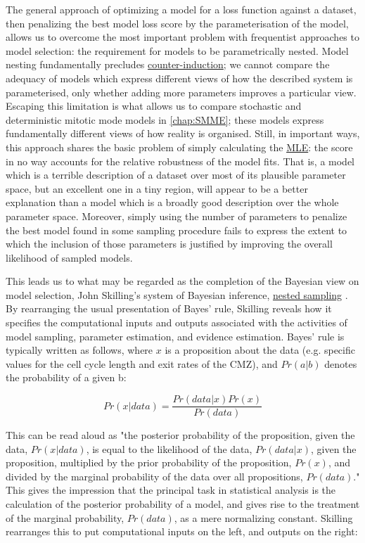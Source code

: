 The general approach of optimizing a model for a loss function against a dataset, then penalizing the best model loss score by the parameterisation of the model, allows us to overcome the most important problem with frequentist approaches to model selection: the requirement for models to be parametrically nested. Model nesting fundamentally precludes \hyperref[sec:Feyerabend]{counter-induction}; we cannot compare the adequacy of models which express different views of how the described system is parameterised, only whether adding more parameters improves a particular view. Escaping this limitation is what allows us to compare stochastic and deterministic mitotic mode models in \autoref{chap:SMME}; these models express fundamentally different views of how reality is organised. Still, in important ways, this approach shares the basic problem of simply calculating the \hyperref[MLE]{MLE}: the score in no way accounts for the relative robustness of the model fits. That is, a model which is a terrible description of a dataset over most of its plausible parameter space, but an excellent one in a tiny region, will appear to be a better explanation than a model which is a broadly good description over the whole parameter space. Moreover, simply using the number of parameters to penalize the best model found in some sampling procedure fails to express the extent to which the inclusion of those parameters is justified by improving the overall likelihood of sampled models.

This leads us to what may be regarded as the completion of the Bayesian view on model selection, John Skilling's system of Bayesian inference, \hyperref[sec:nested]{nested sampling} \cite{Skilling2006,Skilling2012,Skilling2019}. By rearranging the usual presentation of Bayes' rule, Skilling reveals how it specifies the computational inputs and outputs associated with the activities of model sampling, parameter estimation, and evidence estimation. Bayes' rule is typically written as follows, where $x$ is a proposition about the data (e.g. specific values for the cell cycle length and exit rates of the CMZ), and $Pr(a|b)$ denotes the probability of a given b:

\[Pr(x|data) = \frac{Pr(data|x)Pr(x)}{Pr(data)}\]

This can be read aloud as "the posterior probability of the proposition, given the data, $Pr(x|data)$, is equal to the likelihood of the data, $Pr(data|x)$, given the proposition, multiplied by the prior probability of the proposition, $Pr(x)$, and divided by the marginal probability of the data over all propositions, $Pr(data)$." This gives the impression that the principal task in statistical analysis is the calculation of the posterior probability of a model, and gives rise to the treatment of the marginal probability, $Pr(data)$, as a mere normalizing constant. Skilling rearranges this to put computational inputs on the left, and outputs on the right:

